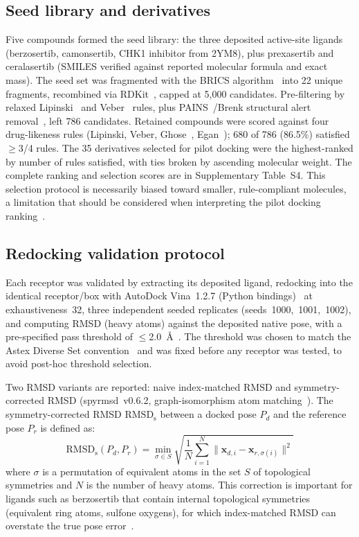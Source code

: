 \documentclass[global,twocolumn]{svjour}
\begin{document}
\subsection{Seed library and derivatives}

Five compounds formed the seed library: the three deposited active-site
ligands (berzosertib, camonsertib, CHK1 inhibitor from 2YM8), plus prexasertib
and ceralasertib (SMILES verified against reported molecular formula and exact
mass). The seed set was fragmented with the BRICS algorithm~\cite{degen2008}
into 22 unique fragments, recombined via RDKit~\cite{rdkit}, capped at 5,000
candidates. Pre-filtering by relaxed Lipinski~\cite{lipinski1997} and
Veber~\cite{veber2002} rules, plus PAINS~\cite{baell2010}/Brenk structural
alert removal~\cite{brenk2008}, left 786 candidates. Retained compounds were
scored against four drug-likeness rules (Lipinski, Veber, Ghose~\cite{ghose1999},
Egan~\cite{egan2000}); 680 of 786 (86.5\%) satisfied $\ge$3/4 rules. The 35
derivatives selected for pilot docking were the highest-ranked by number of
rules satisfied, with ties broken by ascending molecular weight. The complete
ranking and selection scores are in Supplementary Table~S4. This selection
protocol is necessarily biased toward smaller, rule-compliant molecules, a
limitation that should be considered when interpreting the pilot docking
ranking~\cite{siegal2014}.

\subsection{Redocking validation protocol}

Each receptor was validated by extracting its deposited ligand, redocking into
the identical receptor/box with AutoDock Vina~1.2.7
(Python bindings)~\cite{trott2010} at exhaustiveness~32, three independent
seeded replicates (seeds~1000,~1001,~1002), and computing RMSD (heavy atoms)
against the deposited native pose, with a pre-specified pass threshold of
$\le$2.0~\AA{}~\cite{hartshorn2007}. The threshold was chosen to match the
Astex Diverse Set convention~\cite{hartshorn2007} and was fixed before any
receptor was tested, to avoid post-hoc threshold selection.

Two RMSD variants are reported: naive index-matched RMSD and
symmetry-corrected RMSD (spyrmsd~v0.6.2, graph-isomorphism atom
matching~\cite{meli2020}). The symmetry-corrected RMSD $\mathrm{RMSD_s}$
between a docked pose $P_d$ and the reference pose $P_r$ is defined as:
\[
\mathrm{RMSD_s}(P_d, P_r) = \min_{\sigma \in S} \sqrt{\frac{1}{N}
\sum_{i=1}^{N} \| \mathbf{x}_{d,i} - \mathbf{x}_{r,\sigma(i)} \|^2 }
\]
where $\sigma$ is a permutation of equivalent atoms in the set $S$ of
topological symmetries and $N$ is the number of heavy atoms. This correction
is important for ligands such as berzosertib that contain internal topological
symmetries (equivalent ring atoms, sulfone oxygens), for which index-matched
RMSD can overstate the true pose error~\cite{meli2020}.
\end{document}
